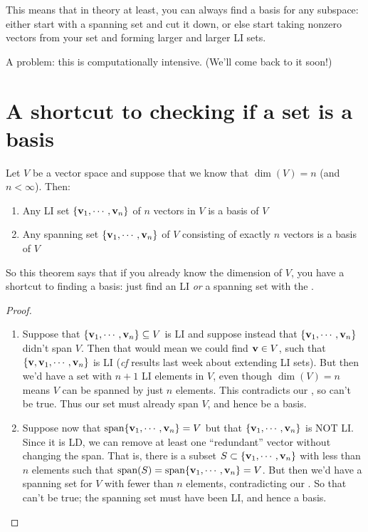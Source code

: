 This means that in theory at least, you can always find a basis for
any subspace:  either start with a spanning set and cut it down, or
else start taking nonzero vectors from your set and forming larger
and larger LI sets.  

A problem:  this is computationally intensive.  (We'll come back to
it soon!)

\section{A shortcut to checking if a set is a basis}

\begin{theorem}
Let $V$ be a vector space and suppose that we know that $\dim(V) = n$ (and $n < \infty$).
Then:
\begin{enumerate}
\item Any LI set $\{\mathbf{v}_1, \cdots, \mathbf{v}_n\}$ of $  n $ vectors in $V$ is a basis of $V$  
\item Any spanning set $\{\mathbf{v}_1, \cdots, \mathbf{v}_n\}$ of $V$ consisting of exactly 
$  n $ vectors is a basis of $V$  
\end{enumerate}
\end{theorem}

So this theorem says that if you already know the dimension of $V$, you have a shortcut to finding a basis:  just find an LI \emph{or} a spanning set with the . 

\begin{proof}~
\begin{enumerate}
\item Suppose that $\{\mathbf{v}_1, \cdots, \mathbf{v}_n\} \subseteq V$ is LI and suppose
instead that $\{\mathbf{v}_1, \cdots, \mathbf{v}_n\}$ didn't span $V$.
Then that would mean we could find $\mathbf{v} \in V$, such that $\{\mathbf{v}, \mathbf{v}_1, \cdots, \mathbf{v}_n\}$ is LI (\emph{cf} results last week about extending LI sets).
But then we'd have a set with $n+1$ LI elements in $V$, even though
$\dim(V)=n$ means $V$ can be spanned by just $n$ elements.  This 
contradicts our , so can't be true.  Thus
our set must already span $V$, and hence be a basis.

\item Suppose now that  $\textrm{span}\{\mathbf{v}_1, \cdots, \mathbf{v}_n\} = V$ but that
 $\{\mathbf{v}_1, \cdots, \mathbf{v}_n\}$ is NOT LI.  Since it is LD, we can 
remove at least one ``redundant'' vector without changing the span.
That is, there is a subset $S \subset  \{\mathbf{v}_1, \cdots, \mathbf{v}_n\}$
with less than $n$ elements such that $\textrm{span}(S) = \textrm{span}\{\mathbf{v}_1, \cdots, \mathbf{v}_n\}=V$.  But then we'd have a spanning set for $V$ with fewer than $n$ elements,
contradicting our .  So that can't be true;
the spanning set must have been LI, and hence a basis.
\end{enumerate}
\end{proof}

